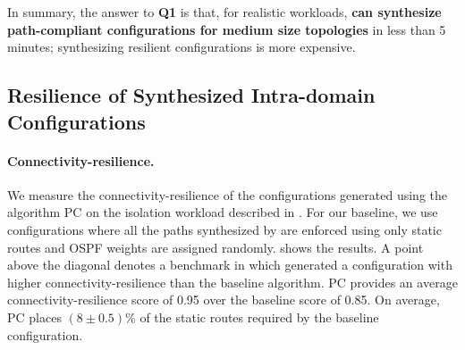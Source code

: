 In summary, the answer to \textbf{Q1} is that, for realistic workloads,
\textbf{\name can synthesize path-compliant configurations for medium size
topologies} in less than 5 minutes; synthesizing resilient 
configurations is more expensive. 


\subsection{Resilience of Synthesized Intra-domain Configurations} \label{sec:reseval}
\paragraph{Connectivity-resilience.}
We measure the connectivity-resilience of the configurations 
generated using the algorithm PC on the isolation workload described in
. 
For our baseline, we use configurations 
where all the paths synthesized by \genesis
are enforced using only static routes and
OSPF weights are assigned randomly.
shows the results. A point above the diagonal 
denotes a benchmark in which \name
generated a configuration with higher connectivity-resilience than
the baseline algorithm.
PC provides an average connectivity-resilience score 
of 0.95 over the baseline score 
of 0.85.
On average, PC places
$(8 \pm 0.5)$\% of the static routes required by the baseline configuration. 


